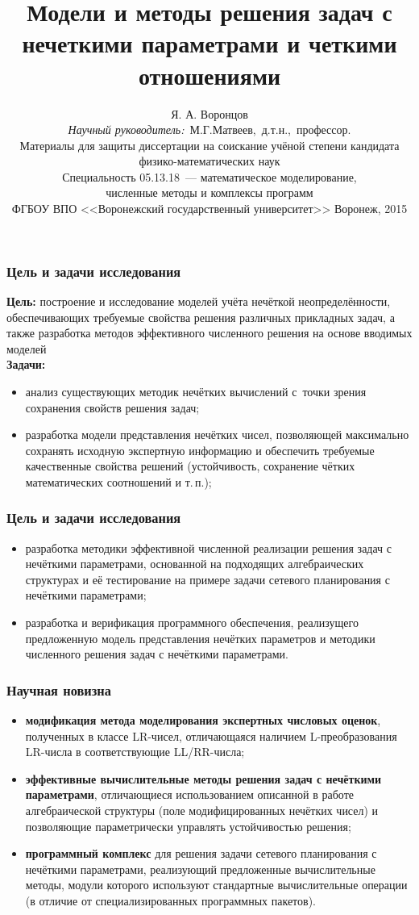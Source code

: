 \documentclass[12pt]{beamer}
\title{\Large{Модели и методы решения задач с нечеткими параметрами и четкими отношениями}}
\author{\normalsize{%
Я. А. Воронцов\\%
\emph{Научный руководитель:}~М.Г.Матвеев,~д.т.н.,~профессор.}\\%
\small{
\vspace{10pt}
Материалы для защиты диссертации на соискание учёной степени кандидата физико-математических наук \\
Специальность 05.13.18~--- математическое моделирование,\\ численные методы и комплексы программ \\
\vspace{10pt}
ФГБОУ ВПО <<Воронежский государственный университет>>%
\vspace{10pt}%
}
\small{Воронеж, 2015}
}
\begin{document}
\maketitle

\begin{frame}
  \frametitle{Цель и задачи исследования}
  \textbf{Цель:} построение и исследование моделей учёта нечёткой неопределённости, обеспечивающих требуемые свойства решения различных прикладных задач, а также разработка методов эффективного численного решения на основе вводимых моделей \\
  \textbf{Задачи:}
  \begin{itemize}
    \item анализ существующих методик нечётких вычислений с~точки зрения сохранения свойств решения задач;
    \item разработка модели представления нечётких чисел, позволяющей максимально сохранять исходную экспертную информацию и обеспечить требуемые качественные свойства решений (устойчивость, сохранение чётких математических соотношений и т.\,п.);
  \end{itemize}  
\end{frame}

\begin{frame}
  \frametitle{Цель и задачи исследования}
  \begin{itemize}
    \item разработка методики эффективной численной реализации решения задач с нечёткими параметрами, основанной на подходящих алгебраических структурах и её тестирование на примере задачи сетевого планирования с нечёткими параметрами;
    \item разработка и верификация программного обеспечения, реализущего предложенную модель представления нечётких параметров и методики численного решения задач с нечёткими параметрами.
  \end{itemize}  
\end{frame}


\begin{frame}
  \frametitle{Научная новизна}
  \begin{itemize}
    \item \textbf{модификация метода моделирования экспертных числовых оценок}, полученных в классе LR-чисел, отличающаяся наличием L-преобразования LR-числа в соответствующие LL/RR-числа;
    \item \textbf{эффективные вычислительные методы решения задач с нечёткими параметрами}, отличающиеся использованием описанной в работе алгебраической структуры (поле модифицированных нечётких чисел) и позволяющие параметрически управлять устойчивостью решения;
    \item \textbf{программный комплекс} для решения задачи сетевого планирования с нечёткими параметрами, реализующий предложенные вычислительные методы, модули которого используют стандартные вычислительные операции (в отличие от специализированных программных пакетов).
  \end{itemize}
\end{frame}
\end{document}
